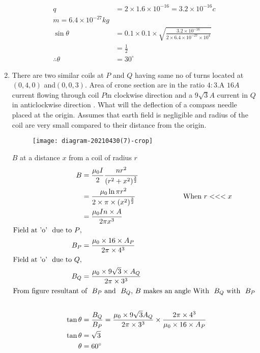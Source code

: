 \begin{enumerate}[ label=\color{ocre}\textbf{\arabic*.}]
\begin{answer}
\begin{align*}
		q&=2\times1.6\times10^{-16}=3.2\times10^{-16}c\\
		m=6.4\times10^{-27}kg\\
		\sin\theta&=0.1\times0.1\times\sqrt{\frac{3.2\times10^{-16}}{2\times6.4\times10^{-27}\times10^4}}\\
		&=\frac{1}{2}\\
		\therefore\theta&=30^\circ
		\end{align*}
	\end{answer}
	\item There are two similar coils at $P$ and $Q$ having same no of turns located at $(0,4,0)$ and$(0,0,3)$. Area of crone section are in the ratio $4:3$.A $16 A$ current flowing through coil $P$in clockwise direction and a $9\sqrt{3} A$ current in $Q$ in anticlockwise direction . What will the deflection of a compass needle placed at the origin. Assumes that earth field is negligible and radius of the coil are very small compared to their distance from the origin.
	\begin{figure}[H]
		\begin{center}
			\texttt{[image: diagram-20210430(7)-crop]}
		\end{center}
	\end{figure}
	\begin{answer}
		$B$ at a distance $x$ from a coil of radius $r$\\
		\begin{align*}
		B&=\frac{\mu_0I}{2}\frac{nr^2}{(r^2+x^2)^\frac{3}{2}}\\
		&=\frac{\mu_0 \ln \pi r^2}{2\times\pi \times(x^2)^\frac{3}{2}}\hspace{2cm}\quad \text{When}\ r<<<x\\
		&=\frac{\mu_0In\times A}{2\pi x^3}\\
		\text{Field at 'o' \ due to $P$},\\
		B_P&=\frac{\mu_0\times16\times A_P}{2\pi\times4^3}\\
		\text{Field at 'o' \ due to $Q$},\\
		B_Q&=\frac{\mu_0\times9\sqrt{3}\times A_Q}{2\pi\times3^3}\\
		\intertext{From figure resultant of \ $B_P$\ and \ $B_Q$,\ $B$ makes an angle With \ $B_Q$\ with \ $B_P$}\\
		\tan\theta&=\frac{B_Q}{B_P}
		=\frac{\mu_0\times9\sqrt{3} A_Q}{2\pi\times3^3}\times\frac{2\pi\times4^3}{\mu_0\times16\times A_P}\\
		\tan\theta&=\sqrt{3}\\
		\theta&=60^\circ
		\end{align*}
	\end{answer}
\end{enumerate}
